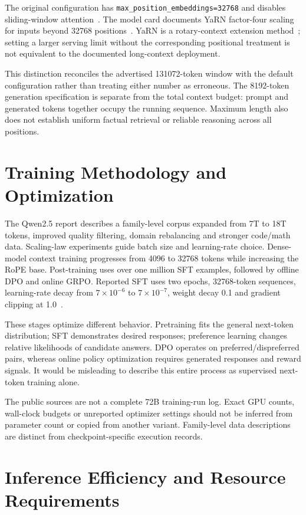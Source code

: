 \documentclass[conference]{IEEEtran}
\begin{document}
The original configuration has \texttt{max\_position\_embeddings=32768} and disables sliding-window attention~\cite{config}. The model card documents YaRN factor-four scaling for inputs beyond 32768 positions~\cite{card}. YaRN is a rotary-context extension method~\cite{yarn}; setting a larger serving limit without the corresponding positional treatment is not equivalent to the documented long-context deployment.

This distinction reconciles the advertised 131072-token window with the default configuration rather than treating either number as erroneous. The 8192-token generation specification is separate from the total context budget: prompt and generated tokens together occupy the running sequence. Maximum length also does not establish uniform factual retrieval or reliable reasoning across all positions.

\section{Training Methodology and Optimization}
The Qwen2.5 report describes a family-level corpus expanded from 7T to 18T tokens, improved quality filtering, domain rebalancing and stronger code/math data. Scaling-law experiments guide batch size and learning-rate choice. Dense-model context training progresses from 4096 to 32768 tokens while increasing the RoPE base. Post-training uses over one million SFT examples, followed by offline DPO and online GRPO. Reported SFT uses two epochs, 32768-token sequences, learning-rate decay from $7\times10^{-6}$ to $7\times10^{-7}$, weight decay 0.1 and gradient clipping at 1.0~\cite{report}.

These stages optimize different behavior. Pretraining fits the general next-token distribution; SFT demonstrates desired responses; preference learning changes relative likelihoods of candidate answers. DPO operates on preferred/dispreferred pairs, whereas online policy optimization requires generated responses and reward signals. It would be misleading to describe this entire process as supervised next-token training alone.

The public sources are not a complete 72B training-run log. Exact GPU counts, wall-clock budgets or unreported optimizer settings should not be inferred from parameter count or copied from another variant. Family-level data descriptions are distinct from checkpoint-specific execution records.

\section{Inference Efficiency and Resource Requirements}
\end{document}

